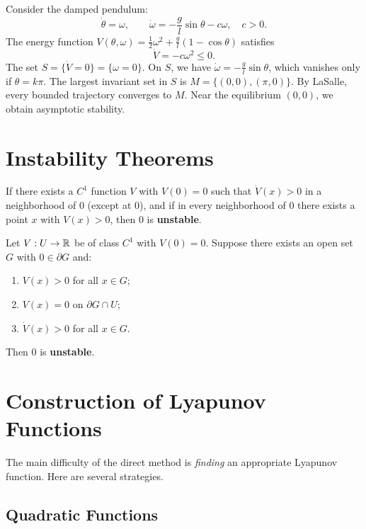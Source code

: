 \begin{example}
Consider the damped pendulum:
\[
    \dot{\theta} = \omega, \qquad \dot{\omega} = -\frac{g}{l}\sin\theta - c\omega,
    \quad c > 0.
\]
The energy function
$V(\theta, \omega) = \frac{1}{2}\omega^2 + \frac{g}{l}(1 - \cos\theta)$
satisfies
\[
    \dot{V} = -c\omega^2 \leq 0.
\]
The set $S = \{\dot{V} = 0\} = \{\omega = 0\}$. On $S$, we have
$\dot{\omega} = -\frac{g}{l}\sin\theta$, which vanishes only if
$\theta = k\pi$. The largest invariant set in $S$ is
$M = \{(0, 0), (\pi, 0)\}$. By LaSalle, every bounded trajectory converges
to $M$. Near the equilibrium $(0,0)$, we obtain asymptotic stability.
\end{example}

\section{Instability Theorems}

\begin{theorem}
\label{thm:instability-lyap}
If there exists a $C^1$ function $V$ with $V(0) = 0$ such that
$\dot{V}(x) > 0$ in a neighborhood of $0$ (except at $0$), and if in every
neighborhood of $0$ there exists a point $x$ with $V(x) > 0$, then $0$ is
\textbf{unstable}.
\end{theorem}

\begin{theorem}
Let $V : U \to \mathbb{R}$ be of class $C^1$ with $V(0) = 0$. Suppose there exists
an open set $G$ with $0 \in \partial G$ and:
\begin{enumerate}
    \item $V(x) > 0$ for all $x \in G$;
    \item $V(x) = 0$ on $\partial G \cap U$;
    \item $\dot{V}(x) > 0$ for all $x \in G$.
\end{enumerate}
Then $0$ is \textbf{unstable}.
\end{theorem}

\section{Construction of Lyapunov Functions}

The main difficulty of the direct method is \emph{finding} an appropriate
Lyapunov function. Here are several strategies.

\subsection{Quadratic Functions}

